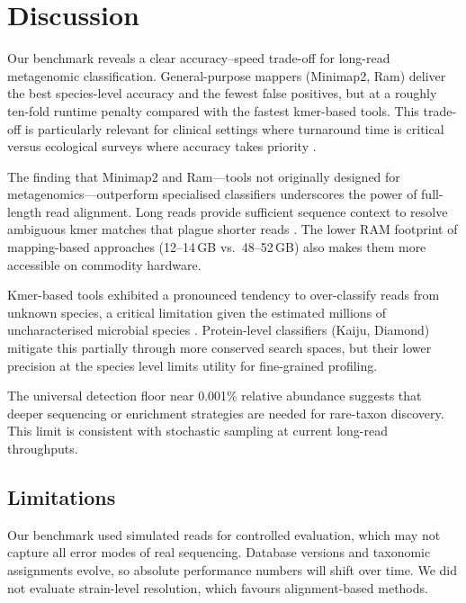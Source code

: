 \documentclass[12pt]{article}
\begin{document}
\section{Discussion}

Our benchmark reveals a clear accuracy--speed trade-off for long-read metagenomic classification. General-purpose mappers (Minimap2, Ram) deliver the best species-level accuracy and the fewest false positives, but at a roughly ten-fold runtime penalty compared with the fastest kmer-based tools. This trade-off is particularly relevant for clinical settings where turnaround time is critical versus ecological surveys where accuracy takes priority \citep{chiu2019clinical}.

The finding that Minimap2 and Ram---tools not originally designed for metagenomics---outperform specialised classifiers underscores the power of full-length read alignment. Long reads provide sufficient sequence context to resolve ambiguous kmer matches that plague shorter reads \citep{li2018minimap2}. The lower RAM footprint of mapping-based approaches (12--14\,GB vs.\ 48--52\,GB) also makes them more accessible on commodity hardware.

Kmer-based tools exhibited a pronounced tendency to over-classify reads from unknown species, a critical limitation given the estimated millions of uncharacterised microbial species \citep{locey2016scaling}. Protein-level classifiers (Kaiju, Diamond) mitigate this partially through more conserved search spaces, but their lower precision at the species level limits utility for fine-grained profiling.

The universal detection floor near 0.001\% relative abundance suggests that deeper sequencing or enrichment strategies are needed for rare-taxon discovery. This limit is consistent with stochastic sampling at current long-read throughputs.

\subsection{Limitations}

Our benchmark used simulated reads for controlled evaluation, which may not capture all error modes of real sequencing. Database versions and taxonomic assignments evolve, so absolute performance numbers will shift over time. We did not evaluate strain-level resolution, which favours alignment-based methods.

\end{document}
